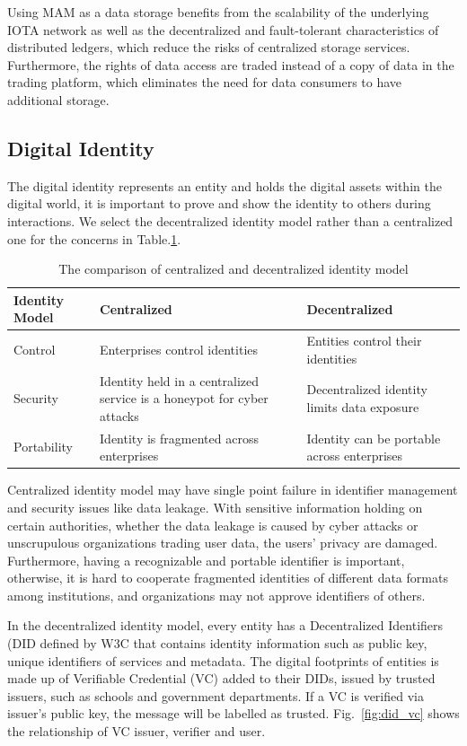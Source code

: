 \documentclass[conference]{IEEEtran}
\begin{document}
Using MAM as a data storage benefits from the scalability of the underlying IOTA network as well as the decentralized and fault-tolerant characteristics of distributed ledgers, which reduce the risks of centralized storage services. Furthermore, the rights of data access are traded instead of a copy of data in the trading platform, which eliminates the need for data consumers to have additional storage.

\subsection{Digital Identity}
The digital identity represents an entity and holds the digital assets within the digital world, it is important to prove and show the identity to others during interactions. We select the decentralized identity model rather than a centralized one for the concerns in Table.\ref{tab:did}.

\begin{table}[h]
	\caption{The comparison of centralized and decentralized identity model}
	\label{tab:did}
	\begin{tabularx}{\linewidth}{|l|X|X|}
	\hline
		\textbf{Identity Model} & \textbf{Centralized} & \textbf{Decentralized} \\
		\hline
		Control & Enterprises control identities & Entities control their identities \\
		\hline
		Security & Identity held in a centralized service is a honeypot for cyber attacks & Decentralized identity limits data exposure \\
		\hline
		Portability & Identity is fragmented across enterprises & Identity can be portable across enterprises \\
		\hline
	\end{tabularx}
\end{table}

Centralized identity model may have single point failure in identifier management and security issues like data leakage. With sensitive information holding on certain authorities, whether the data leakage is caused by cyber attacks or unscrupulous organizations trading user data, the users' privacy are damaged. Furthermore, having a recognizable and portable identifier is important, otherwise, it is hard to cooperate fragmented identities of different data formats among institutions, and organizations may not approve identifiers of others.

In the decentralized identity model, every entity has a Decentralized Identifiers (DID\cite{DID} defined by W3C that contains identity information such as public key, unique identifiers of services and metadata. The digital footprints of entities is made up of Verifiable Credential (VC) added to their DIDs, issued by trusted issuers, such as schools and government departments. If a VC is verified via issuer's public key, the message will be labelled as trusted. Fig.~\ref{fig:did_vc} shows the relationship of VC issuer, verifier and user.
\end{document}
